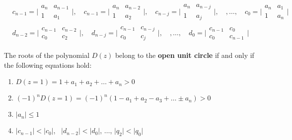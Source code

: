 \begin{equation}
    \begin{aligned}
        &c_{n-1}=\bigg| \begin{matrix}
            a_{n}&a_{n-1}\\
            1&a_{1}
        \end{matrix}\bigg|,  \quad 
        c_{n-1}=\bigg| \begin{matrix}
            a_{n}&a_{n-2}\\
            1&a_{2}
        \end{matrix}\bigg|, \quad 
        c_{n-j}=\bigg| \begin{matrix}
            a_{n}&a_{n-j}\\
            1&a_{j}
        \end{matrix}\bigg|, \quad, \dots, \quad
        c_{0}=\bigg| \begin{matrix}
            a_{n}&a_{1}\\
            1&a_{n}
        \end{matrix}\bigg|\\
        &d_{n-2}=\bigg|\begin{matrix}
            c_{n-1}&c_{n-2}\\
            c_0&c_2
        \end{matrix} \bigg|, \quad 
        d_{n-j}=\bigg|\begin{matrix}
            c_{n-1}&c_{n-j}\\
            c_0&c_j
        \end{matrix} \bigg|, \quad, \dots, \quad
        d_0=\bigg| \begin{matrix}
            c_{n-1}&c_0\\
            c_{0}&c_{n-1} 
        \end{matrix}\bigg| 
    \end{aligned}
\end{equation}
\begin{theorem}\label{th:Jury_thm}
The roots of the polynomial $D(z)$ belong to the \textbf{open unit circle} if and only if the following equations hold:
\begin{enumerate}
    \itemsep-0.2em
    \item $D(z=1)=1+a_1+a_2+\dots+a_n>0$
    \item $(-1)^n D(z=1)=(-1)^n (1-a_1+a_2-a_3+\dots\pm{a_n})>0$
    \item $\vert a_n \vert \le 1$
    \item $\vert c_{n-1} \vert < \vert c_0 \vert$, \ $\vert d_{n-2}\vert < \vert d_0 \vert$, $\dots$, $\vert q_2 \vert < \vert q_0 \vert$
\end{enumerate}
\end{theorem}

